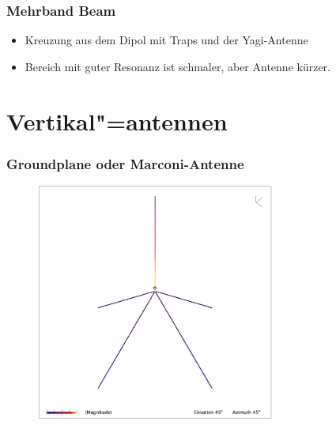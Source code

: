 \begin{frame}
  \frametitle{Mehrband Beam}
  \begin{center} \large
    \begin{itemize}
      \item Kreuzung aus dem Dipol mit Traps und der Yagi-Antenne
      \item Bereich mit guter Resonanz ist schmaler, aber Antenne kürzer.
    \end{itemize}
  \end{center}
\end{frame}

\section*{Vertikal"=antennen}

\begin{frame}
  \frametitle{Groundplane oder Marconi-Antenne}
  \begin{center}
    \begin{figure}
      \includegraphics[width=0.7\textwidth,height=.75\textheight,keepaspectratio]{a09/GP-DB4UM.png}
    \end{figure}
  \end{center}
\end{frame}

